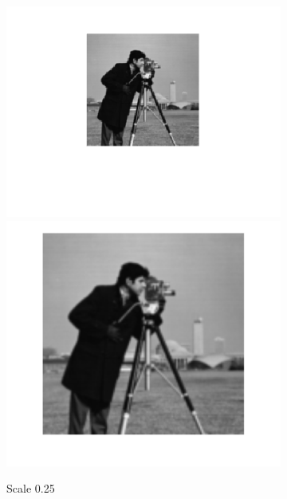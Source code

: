 \documentclass{article}
\begin{document}
\begin{figure}[h!]
\begin{subfigure}[t]{0.3\textwidth}
		\centering
		\includegraphics[width=\linewidth]{./output_images/DOWN_anti-alias_bilinear_scale_0_250000.png}
		\includegraphics[width=\linewidth]{./output_images/UP_anti-alias_bilinear_scale_0_250000.png}
		\caption{Scale 0.25}
	\end{subfigure}
	~
	\begin{subfigure}[t]{0.3\textwidth}
		\centering

\end{subfigure}
\end{figure}
\end{document}
